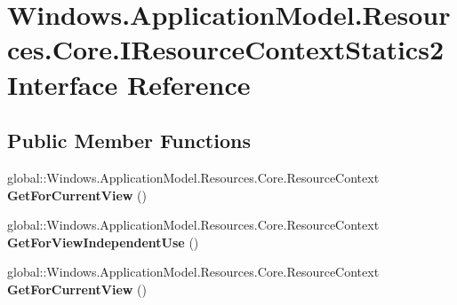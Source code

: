 \hypertarget{interface_windows_1_1_application_model_1_1_resources_1_1_core_1_1_i_resource_context_statics2}{}\section{Windows.\+Application\+Model.\+Resources.\+Core.\+I\+Resource\+Context\+Statics2 Interface Reference}
\label{interface_windows_1_1_application_model_1_1_resources_1_1_core_1_1_i_resource_context_statics2}
\subsection*{Public Member Functions}
\begin{DoxyCompactItemize}
\item 
\mbox{\label{interface_windows_1_1_application_model_1_1_resources_1_1_core_1_1_i_resource_context_statics2_a839dd450740f93fdc7662805838979a9}} 
global\+::\+Windows.\+Application\+Model.\+Resources.\+Core.\+Resource\+Context {\bfseries Get\+For\+Current\+View} ()
\item 
\mbox{\label{interface_windows_1_1_application_model_1_1_resources_1_1_core_1_1_i_resource_context_statics2_a9904808e170b450caac95f15a84950d0}} 
global\+::\+Windows.\+Application\+Model.\+Resources.\+Core.\+Resource\+Context {\bfseries Get\+For\+View\+Independent\+Use} ()
\item 
\mbox{\label{interface_windows_1_1_application_model_1_1_resources_1_1_core_1_1_i_resource_context_statics2_a839dd450740f93fdc7662805838979a9}} 
global\+::\+Windows.\+Application\+Model.\+Resources.\+Core.\+Resource\+Context {\bfseries Get\+For\+Current\+View} ()
\item 
\mbox{\label{interface_windows_1_1_application_model_1_1_resources_1_1_core_1_1_i_resource_context_statics2_a9904808e170b450caac95f15a84950d0}} 

\end{DoxyCompactItemize}
